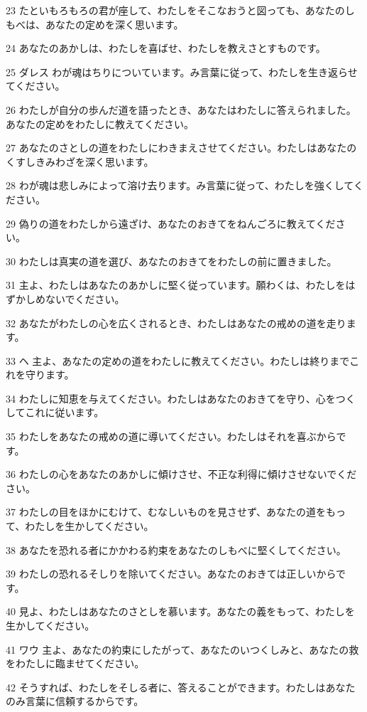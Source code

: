 \par 23 たといもろもろの君が座して、わたしをそこなおうと図っても、あなたのしもべは、あなたの定めを深く思います。
\par 24 あなたのあかしは、わたしを喜ばせ、わたしを教えさとすものです。
\par 25 ダレス わが魂はちりについています。み言葉に従って、わたしを生き返らせてください。
\par 26 わたしが自分の歩んだ道を語ったとき、あなたはわたしに答えられました。あなたの定めをわたしに教えてください。
\par 27 あなたのさとしの道をわたしにわきまえさせてください。わたしはあなたのくすしきみわざを深く思います。
\par 28 わが魂は悲しみによって溶け去ります。み言葉に従って、わたしを強くしてください。
\par 29 偽りの道をわたしから遠ざけ、あなたのおきてをねんごろに教えてください。
\par 30 わたしは真実の道を選び、あなたのおきてをわたしの前に置きました。
\par 31 主よ、わたしはあなたのあかしに堅く従っています。願わくは、わたしをはずかしめないでください。
\par 32 あなたがわたしの心を広くされるとき、わたしはあなたの戒めの道を走ります。
\par 33 ヘ 主よ、あなたの定めの道をわたしに教えてください。わたしは終りまでこれを守ります。
\par 34 わたしに知恵を与えてください。わたしはあなたのおきてを守り、心をつくしてこれに従います。
\par 35 わたしをあなたの戒めの道に導いてください。わたしはそれを喜ぶからです。
\par 36 わたしの心をあなたのあかしに傾けさせ、不正な利得に傾けさせないでください。
\par 37 わたしの目をほかにむけて、むなしいものを見させず、あなたの道をもって、わたしを生かしてください。
\par 38 あなたを恐れる者にかかわる約束をあなたのしもべに堅くしてください。
\par 39 わたしの恐れるそしりを除いてください。あなたのおきては正しいからです。
\par 40 見よ、わたしはあなたのさとしを慕います。あなたの義をもって、わたしを生かしてください。
\par 41 ワウ 主よ、あなたの約束にしたがって、あなたのいつくしみと、あなたの救をわたしに臨ませてください。
\par 42 そうすれば、わたしをそしる者に、答えることができます。わたしはあなたのみ言葉に信頼するからです。
